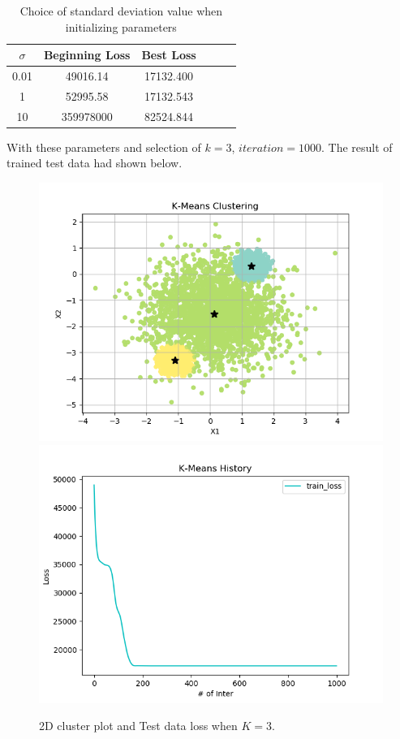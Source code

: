 \documentclass[10pt,letterpaper]{article}
\begin{document}




\begin{table}[H]
\centering
{\small

\begin{tabular}{cccccc}
\hline
$\sigma $ & Beginning Loss      & Best Loss\\ \hline
0.01 & 49016.14  & 17132.400 \\ 
1 & 52995.58  & 17132.543 \\ 
10 & 359978000 & 82524.844\\ \hline
\end{tabular}
}
\vspace{-0.2cm}
\caption{Choice of standard deviation value when initializing parameters}
\label{tab:Number of hidden units}
\vspace{-0.4cm}
\end{table}

With these parameters and selection of $k=3$, $iteration=1000$. The result of trained test data had shown below. \\

\begin{figure}[H]
\centering

  \includegraphics[width=.42\linewidth]{imgs/K_cluster_G.png}
  \includegraphics[width=.42\linewidth]{imgs/lossC.png}
  \caption{2D cluster plot and Test data loss when $K=3$.}

\end{figure}
\end{document}
